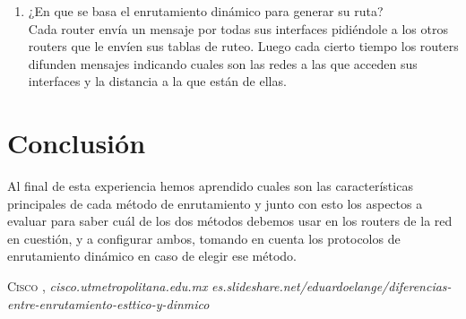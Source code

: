 \documentclass{udpreport}
\begin{document}
\begin{enumerate}
            \item ¿En que se basa el enrutamiento dinámico para generar su ruta?\\
            	Cada router envía un mensaje por todas sus interfaces pidiéndole a los otros routers que le envíen sus tablas de ruteo. Luego cada cierto tiempo los routers difunden mensajes indicando cuales son las redes a las que acceden sus interfaces y la distancia a la que están de ellas.
 
  	     
	\end{enumerate}
	
    
	
\chapter{Conclusión}
 Al final de esta experiencia hemos aprendido cuales son las características principales de cada método de enrutamiento y junto con
 esto los aspectos a evaluar para saber cuál de los dos métodos debemos usar en los routers de la red en cuestión, y a configurar
 ambos, tomando en cuenta los protocolos de enrutamiento dinámico en caso de elegir ese método.\\
\begin{thebibliography}{x}
 \textsc{Cisco },
\textit{cisco.utmetropolitana.edu.mx}
\textit{es.slideshare.net/eduardoelange/diferencias-entre-enrutamiento-esttico-y-dinmico}

\end{thebibliography}
\end{document}
